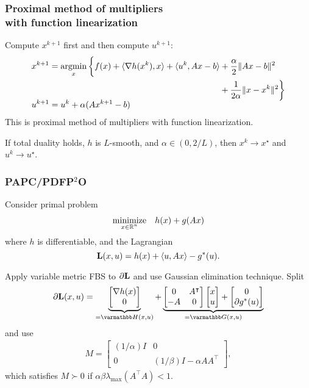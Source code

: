 \documentclass[10pt,mathserif]{beamer}
\begin{document}
\begin{frame}[fragile]
\frametitle{Proximal method of multipliers\\ with function linearization}
Compute $x^{k+1}$ first and then compute $ u ^{k+1}$:
\begin{align*}
  \label{eq:pmmfl_x}
    x^{k+1} & = \operatorname*{argmin}_x \bigg\{f(x) + \langle\nabla h(x^k),x\rangle +\langle  u ^k, Ax-b\rangle + \frac{\alpha }{2}\|Ax-b\|^2 \\
    &\qquad\qquad\qquad\qquad\qquad\qquad\qquad\qquad\qquad\qquad+ \frac{1}{2\alpha}\|x-x^k\|^2\bigg\}\\[-0.5em]
     u ^{k+1} & =  u ^k + \alpha (Ax^{k+1}-b)
\end{align*}
This is proximal method of multipliers with function linearization.
\vspace{0.2in}


If total duality holds, $h$ is $L$-smooth, and $\alpha\in(0,2/L)$, then $x^k\to x^\star$ and $u^k\to u^\star$.
\end{frame}

\begin{frame}
\frametitle{PAPC/PDFP$^2$O}
Consider primal problem
\[
\begin{array}{ll}
\underset{\substack{x\in \mathbb{R}^n}}{\mbox{minimize}}&h(x)+g(Ax)
\end{array}
\]
where $h$ is differentiable, and the Lagrangian
\begin{equation*}
\mathbf{L}(x, u )=h(x)+\langle  u , Ax\rangle-g^*( u ).
\end{equation*}

\vspace{0.2in}
Apply variable metric FBS to $\partial \mathbf{L}$ and use Gaussian elimination technique.
Split
\[
\partial \lagrange(x, u )
=
\underbrace{
\begin{bmatrix}
\nabla h(x)\\
0
\end{bmatrix}}
_{=\opH(x, u )}
+
\underbrace{
\begin{bmatrix}
0&A^\intercal\\
-A&0
\end{bmatrix}
\begin{bmatrix}
x\\
 u 
\end{bmatrix}
+
\begin{bmatrix}
0\\
\partial g^*( u )
\end{bmatrix}
}
_{=\opG(x, u )}
\]
and use
\begin{align*}
  M =\begin{bmatrix}
          (1/\alpha)I & 0 \\
          0 & (1/\beta)I - \alpha A A^\intercal
        \end{bmatrix},
\end{align*}
which satisfies $M\succ 0$ if $\alpha\beta\lambda_\mathrm{max}(A^\intercal A)<1$.
\end{frame}
\end{document}
